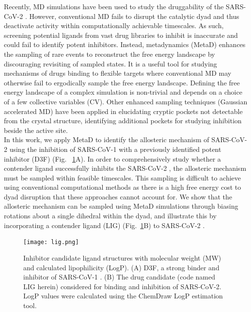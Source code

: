 Recently, MD simulations have been used to study the druggability of the SARS-CoV-2 \mpro\!\!.\cite{macchiagodena2020identification, ghahremanpour2020identification} However, conventional MD fails to disrupt the \mpro catalytic dyad and thus deactivate \mpro activity within computationally achievable timescales. As such, screening potential ligands from vast drug libraries to inhibit \mpro is inaccurate and could fail to identify potent inhibitors. Instead, metadynamics (MetaD) enhances the sampling of rare events to reconstruct the free energy landscape by discouraging revisiting of sampled states. It is a useful tool for studying mechanisms of drugs binding to flexible targets where conventional MD may otherwise fail to ergodically sample the free energy landscape. Defining the free energy landscape of a complex simulation is non-trivial and depends on a choice of a few collective variables (CV).\cite{laio2008metadynamics} Other enhanced sampling techniques (Gaussian accelerated MD\cite{gamd}) have been applied in elucidating cryptic pockets not detectable from the \mpro crystal structure, identifying additional pockets for studying \mpro inhibition beside the active site.\cite{sztain2020elucidation}\\

In this work, we apply MetaD to identify the allosteric mechanism of SARS-CoV-2 \mpro using the inhibition of SARS-CoV-1 \mpro with a previously identified potent inhibitor (D3F)\cite{d3f} (Fig.~ \ref{fig:structures}A). In order to comprehensively study whether a contender ligand successfully inhibits the SARS-CoV-2 \mpro\!\!, the \mpro allosteric mechanism must be sampled within feasible timescales. This sampling is difficult to achieve using conventional computational methods as there is a high free energy cost to dyad disruption that these approaches cannot account for. We show that the allosteric mechanism can be sampled using MetaD simulations through biasing rotations about a single dihedral within the dyad, and illustrate this by incorporating a contender ligand (LIG) (Fig.~\ref{fig:structures}B) to SARS-CoV-2 \mpro\!\!.

\begin{figure}
\centering
\texttt{[image: lig.png]}
\caption{Inhibitor candidate ligand structures with molecular weight (MW) and calculated lipophilicity (LogP). (A) D3F, a strong binder and inhibitor of SARS-CoV-1 \mpro\!\!. (B) The drug candidate (code named LIG herein) considered for binding and inhibition of SARS-CoV-2. LogP values were calculated using the ChemDraw LogP estimation tool.}
\label{fig:structures}
\end{figure}


